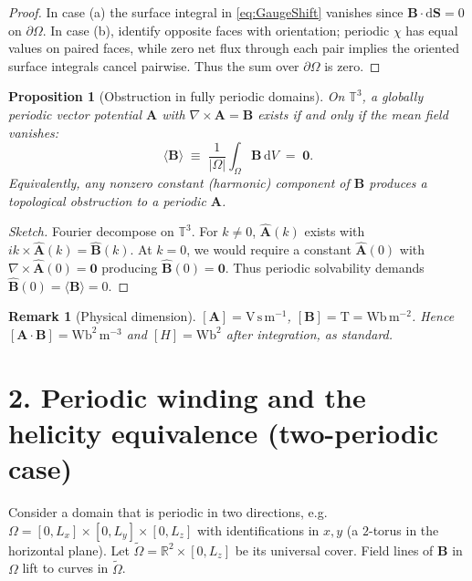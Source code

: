 \documentclass[11pt]{article}
\newtheorem{prop}{Proposition}
\newtheorem{remark}{Remark}
\newcommand{\curl}{\nabla\!\times\!}
\newcommand{\bbR}{\mathbb{R}}
\newcommand{\bbT}{\mathbb{T}}
\newcommand{\ucover}{\widetilde{\Omega}}   %
\newcommand{\mean}[1]{\langle #1\rangle}
\begin{document}
\begin{proof}
In case (a) the surface integral in \eqref{eq:GaugeShift} vanishes since $\bm{B}\cdot\mathrm{d}\bm{S}=0$ on $\partial\Omega$. In case (b), identify opposite faces with orientation; periodic $\chi$ has equal values on paired faces, while zero net flux through each pair implies the oriented surface integrals cancel pairwise. Thus the sum over $\partial\Omega$ is zero.
\end{proof}

\begin{prop}[Obstruction in fully periodic domains]
\label{prop:obstruction}
On $\bbT^3$, a \emph{globally periodic} vector potential $\bm{A}$ with $\curl\bm{A}=\bm{B}$ exists if and only if the mean field vanishes:
\begin{equation}
\mean{\bm{B}} \;\equiv\; \frac{1}{|\Omega|} \int_{\Omega} \bm{B}\,\mathrm{d}V \;=\; \bm{0}.
\label{eq:MeanBZero}
\end{equation}
Equivalently, any nonzero constant (harmonic) component of $\bm{B}$ produces a topological obstruction to a periodic $\bm{A}$.
\end{prop}

\begin{proof}[Sketch]
Fourier decompose on $\bbT^3$. For $k\neq 0$, $\widehat{\bm{A}}(k)$ exists with $ik\times \widehat{\bm{A}}(k)=\widehat{\bm{B}}(k)$. At $k=0$, we would require a constant $\widehat{\bm{A}}(0)$ with $\curl \widehat{\bm{A}}(0)=\bm{0}$ producing $\widehat{\bm{B}}(0)=\bm{0}$. Thus periodic solvability demands $\widehat{\bm{B}}(0)=\mean{\bm{B}}=0$.
\end{proof}

\begin{remark}[Physical dimension]
$[\bm{A}]=\mathrm{V\,s\,m^{-1}}$, $[\bm{B}]=\mathrm{T}=\mathrm{Wb\,m^{-2}}$. Hence $[\bm{A}\cdot\bm{B}]=\mathrm{Wb^2\,m^{-3}}$ and $[H]=\mathrm{Wb^2}$ after integration, as standard.
\end{remark}

\section*{2. Periodic winding and the helicity equivalence (two-periodic case)}

Consider a domain that is periodic in two directions, e.g.\ $\Omega = [0,L_x]\times [0,L_y]\times [0,L_z]$ with identifications in $x,y$ (a $2$-torus in the horizontal plane). Let $\ucover = \bbR^2\times[0,L_z]$ be its universal cover. Field lines of $\bm{B}$ in $\Omega$ lift to curves in $\ucover$.
\end{document}

